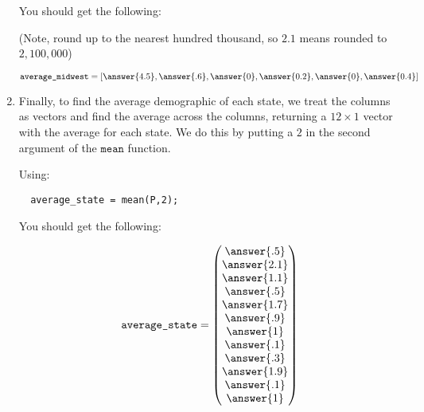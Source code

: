 \documentclass{ximera}
\begin{document}
\begin{example}
\begin{solution}
\begin{enumerate}
You should get the following:

(Note, round up to the nearest hundred thousand, so $2.1$ means rounded to $2,100,000$)

\[
\texttt{average\_midwest} = [\answer{4.5},\answer{.6},\answer{0},\answer{0.2},\answer{0},\answer{0.4}]
\]

\item Finally, to find the average demographic of each state, we treat the columns as vectors and find the average across the columns, returning a $12\times 1$ vector with the average for each state. We do this by putting a $2$ in the second argument of the $\texttt{mean}$ function.

Using:

\begin{verbatim}
  average_state = mean(P,2);
\end{verbatim}

You should get the following:

\[
\texttt{average\_state} = \begin{pmatrix}
  \answer{.5}\\
  \answer{2.1}\\
  \answer{1.1}\\
  \answer{.5}\\
  \answer{1.7}\\
  \answer{.9}\\
  \answer{1}\\
  \answer{.1}\\
  \answer{.3}\\
  \answer{1.9}\\
  \answer{.1}\\
  \answer{1}
\end{pmatrix}
\]


  \end{enumerate}
\end{solution}
\end{example}
\end{document}
